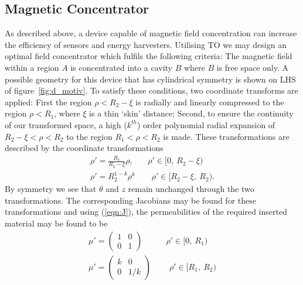 \documentclass[11pt]{iopart}
\begin{document}
\subsection{Magnetic Concentrator}
As described above, a device capable of magnetic field concentration
can increase the efficiency of sensors and energy harvesters.
Utilising TO we may design an optimal field concentrator which fulfils
the following criteria: The magnetic field within a region $A$ is concentrated
into a cavity $B$ where $B$ is free space only. A possible geometry
for this device that has cylindrical symmetry is shown on LHS of
figure~\ref{fig:d_motiv}.  To satisfy these conditions, two coordinate
transforms are applied: First the region $\rho < R_2 - \xi$ is
radially and linearly compressed to the region $\rho < R_1$, where
$\xi$ is a thin `skin' distance; Second, to ensure the continuity of
our transformed space, a high ($k^{th}$) order polynomial radial
expansion of $R_2 - \xi < \rho < R_2$ to the region $R_1 < \rho < R_2$
is made. These transformations are described by the coordinate
transformations
\vspace{-0.2em}
\begin{equation}
  \label{eqn:transform}
  \begin{split}
\rho' = \frac{R_1}{R_2-\xi}\rho,~~~~~~~~\rho'\in[0,~R_2-\xi)~~\\
\rho' = R_2^{1-k}\rho^k~~~~~~~~~\rho'\in[R_2-\xi,~R_2).
  \end{split}
\end{equation}
\vspace{-0.2em}
By symmetry we see that $\theta$ and $z$ remain unchanged through the
two transformations. The corresponding Jacobians may be found for
these transformations and using (\ref{eqn:J}), the
permeabilities of the required inserted material may be found to be
\vspace{-0.2em}
\begin{equation}
  \label{eqn:mat}
  \begin{split}
 \mu' = \begin{pmatrix}1&0\\0&1\end{pmatrix}~~~~~~~~~~~~~\rho'\in[0,~R_1)~~\\
 \mu' = \begin{pmatrix}k&0\\0&1/k\end{pmatrix}~~~~~~~~~~\rho'\in[R_1,~R_2)
  \end{split}
\end{equation}
\vspace{-0.2em}
\end{document}
